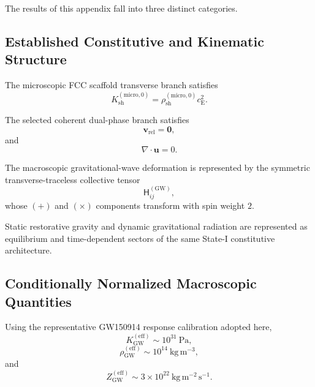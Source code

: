 The results of this appendix fall into three distinct categories.

\subsection*{Established Constitutive and Kinematic Structure}

The microscopic FCC scaffold transverse branch satisfies
\begin{equation}
    K_{\mathrm{sh}}^{(\mathrm{micro},0)} = \rho_{\mathrm{sh}}^{(\mathrm{micro},0)} c_{\mathrm{E}}^2.
\end{equation}

The selected coherent dual-phase branch satisfies
\begin{equation}
    \mathbf{v}_{\mathrm{rel}} = \mathbf{0},
\end{equation}
and
\begin{equation}
    \nabla\cdot\mathbf{u} = 0.
\end{equation}

The macroscopic gravitational-wave deformation is represented by the symmetric transverse-traceless collective tensor
\begin{equation}
    \mathsf{H}_{ij}^{(\mathrm{GW})},
\end{equation}
whose $(+)$ and $(\times)$ components transform with spin weight $2$.

Static restorative gravity and dynamic gravitational radiation are represented as equilibrium and time-dependent sectors of the same State-I constitutive architecture.

\subsection*{Conditionally Normalized Macroscopic Quantities}

Using the representative GW150914 response calibration adopted here,
\begin{equation}
    K_{\mathrm{GW}}^{(\mathrm{eff})} \sim 10^{31}\ \mathrm{Pa},
\end{equation}
\begin{equation}
    \rho_{\mathrm{GW}}^{(\mathrm{eff})} \sim 10^{14}\ \mathrm{kg\,m^{-3}},
\end{equation}
and
\begin{equation}
    Z_{\mathrm{GW}}^{(\mathrm{eff})} \sim 3\times10^{22}\ \mathrm{kg\,m^{-2}\,s^{-1}}.
\end{equation}

